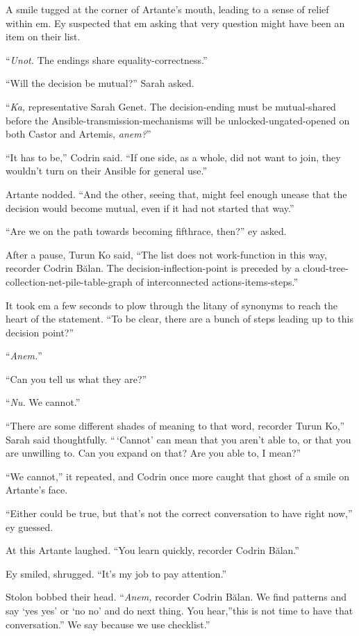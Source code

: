 A smile tugged at the corner of Artante's mouth, leading to a sense of relief within em. Ey suspected that em asking that very question might have been an item on their list.

``\emph{Unot.} The endings share equality-correctness.''

``Will the decision be mutual?'' Sarah asked.

``\emph{Ka,} representative Sarah Genet. The decision-ending must be mutual-shared before the Ansible-transmission-mechanisms will be unlocked-ungated-opened on both Castor and Artemis, \emph{anem?}''

``It has to be,'' Codrin said. ``If one side, as a whole, did not want to join, they wouldn't turn on their Ansible for general use.''

Artante nodded. ``And the other, seeing that, might feel enough unease that the decision would become mutual, even if it had not started that way.''

``Are we on the path towards becoming fifthrace, then?'' ey asked.

After a pause, Turun Ko said, ``The list does not work-function in this way, recorder Codrin Bălan. The decision-inflection-point is preceded by a cloud-tree-collection-net-pile-table-graph of interconnected actions-items-steps.''

It took em a few seconds to plow through the litany of synonyms to reach the heart of the statement. ``To be clear, there are a bunch of steps leading up to this decision point?''

``\emph{Anem.}''

``Can you tell us what they are?''

``\emph{Nu.} We cannot.''

``There are some different shades of meaning to that word, recorder Turun Ko,'' Sarah said thoughtfully. ``\,`Cannot' can mean that you aren't able to, or that you are unwilling to. Can you expand on that? Are you able to, I mean?''

``We cannot,'' it repeated, and Codrin once more caught that ghost of a smile on Artante's face.

``Either could be true, but that's not the correct conversation to have right now,'' ey guessed.

At this Artante laughed. ``You learn quickly, recorder Codrin Bălan.''

Ey smiled, shrugged. ``It's my job to pay attention.''

Stolon bobbed their head. ``\emph{Anem,} recorder Codrin Bălan. We find patterns and say `yes yes' or `no no' and do next thing. You hear,''this is not time to have that conversation.'' We say because we use checklist.''

